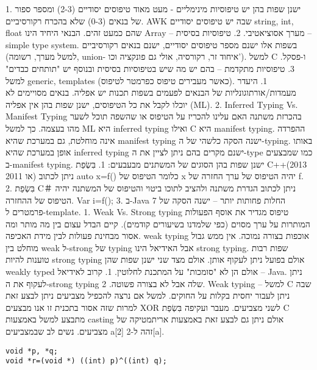 \begin{טבלא}[!htbp]
      1. ישנן שפות בהן יש טיפוסיות מינימליים - מעט מאוד טיפוסים יסודיים (2-3) ומספר ספור של בנאים (0-3) שלא בהכרח רקורסיביים.
      AWK שבה יש טיפוסים יסודיים string, int, float שהם כמעט זהים.
      הבנאי היחיד הינו Array – מערך אסוציאטיבי.
      2. טיפוסיות בסיסית – simple type system. בשפות אלו ישנם מספר טיפוסים יסודיים, ישנם בנאים רקורסיביים (למשל מערך, רשומה, union- איחוד זר, רקורסיה, אולי גם פונקציה וכו'). למשל C ו-פסקל.
      3. טיפוסיות מתקדמת – בהם יש מה שיש בטיפוסיות בסיסית ובנוסף יש "תותחים כבדים" למשל generic, templates (כאשר מעבירים טיפוס כפרמטר לטיפוס).
      1. היעדר מעמדות/אורתוגונליות של הבנאים לפעמים בשפות תכנות יש אפליה. בנאים מסויימים לא יוכלו לקבל את כל הטיפוסים, ישנן שפות בהן אין אפליה (ML).
      2. Inferred Typing Vs. Manifest Typing בהכרזת משתנה האם עלינו להכריז על הטיפוס או שהשפה תוכל לשער מהו בעצמה. כך למשל ML היא inferred typing ואילו C היא manifest typing. ההפרדה אינה מוחלטת, גם במערכת שהיא manifest typing ישנה הסקה כלשהי של ה-typing. באותו אופן במערכת שהיא inferred typing ישנם מקרים בהם ניתן לציין את ה-type כמו שמבצעים ב-manifest typing.
      ישנן שפות בהן הסוגים של המשתנים מבעבעים:
      1. בִּשְׂפַת C++(2013 או 2011) ניתן לכתוב auto x=f() כלומר הטיפוס של x יהיה הטיפוס של ערך החזרה של f.
      2. בִּשְׂפַת C＃ ניתן לכתוב הגדרת משתנה ולהציב לתוכו ביטוי והטיפוס של המשתנה יהיה הטיפוס של ההחזרה. Var i=f();
      3. ב-Java 7 החלות פחותות יותר – ישנה הסקה של פרמטרים ל-template.
      1. Weak Vs. Strong typing טיפוס מגדיר את אוסף הפעולות המותרות על ערך מסוים (כפי שלמדנו בשיעורים קודמים). קיים הבדל עצום בין מה מותר ומה אסור מבחינת פעולות לבין מידת האכיפה.
      weak typing אוכפות בצורה נמוכה. אין ממש גבול מוחלט בין weak ל-strong של typing אבל האידיאל הינו strong typing.
      שפות רבות טוענות להיות strong typing אולם בפועל ניתן לעקוף אותן. אולם מצד שני ישנן שפות שהן weakly typed אולם הן לא "סומכות" על המתכנת לחלוטין.
      1. קרוב לאידיאל – Java. ניתן לעקוף את ה-strong typing שלה אבל לא בצורה פשוטה.
      2. Weak typing – למשל C שבה ניתן לעבור יחסית בקלות על החוקים. למשל אם נרצה להכפיל מצביעים ניתן לבצע זאת למרות שזה אסור
      בתכנית זו אנו מבצעים XOR לשני מצביעים.
      מעבר ועקיפה בִּשְׂפַת C מתבצע למשל באמצעות casting אולם ניתן גם לבצע זאת באמצעות אריתמטיקה של מצביעים. נשים לב שבמצביעים a[2] זהה ל-2[a].

\begin{verbatim}
void *p, *q;
void *r=(void *) ((int) p)^((int) q);
\end{verbatim}


\end{טבלא}
